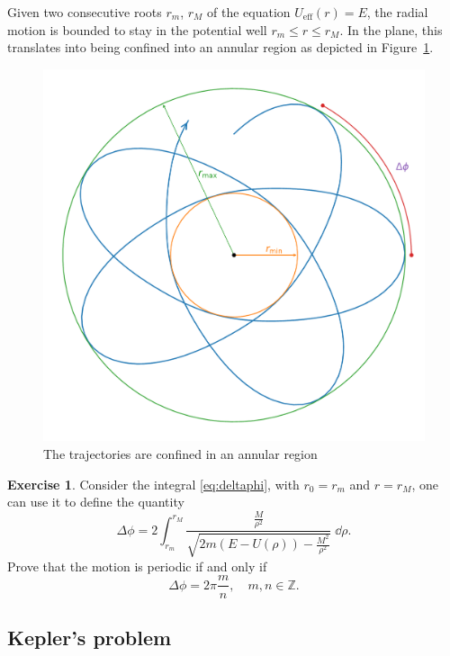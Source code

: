 \documentclass[english,fontsize=11pt,paper=b5]{scrbook}
\numberwithin{equation}{chapter}
\theoremstyle{definition}
\newtheorem{exercise}{Exercise}[chapter]
\begin{document}
    Given two consecutive roots $r_m$, $r_M$ of the equation $U_{\mathrm{eff}}(r) = E$, the radial motion is bounded to stay in the potential well $r_m \leq r \leq r_M$.
    In the plane, this translates into being confined into an annular region as depicted in Figure~\ref{fig:annregio}.

    \begin{figure}[ht]
      \centering
      \includegraphics[width=0.75\linewidth]{images/annular-region.pdf}
      \caption{The trajectories are confined in an annular region \cite{book:ll}}
      \label{fig:annregio}
    \end{figure}

    \begin{exercise}
      Consider the integral \eqref{eq:deltaphi}, with $r_0 = r_m$ and $r = r_M$, one can use it to define the quantity
      \begin{equation}\label{eq:Dektaphi}
        \Delta \phi = 2\int_{r_m}^{r_M} \frac{\frac{M}{\rho^2}}{\sqrt{2m(E-U(\rho)) - \frac{M^2}{\rho^2}}}\;\dd \rho.
      \end{equation}
      Prove that the motion is periodic if and only if
      \begin{equation}
        \Delta \phi = 2\pi \frac mn, \quad m,n\in\mathbb{Z}.
      \end{equation}
    \end{exercise}

    \subsection{Kepler's problem}
\end{document}
